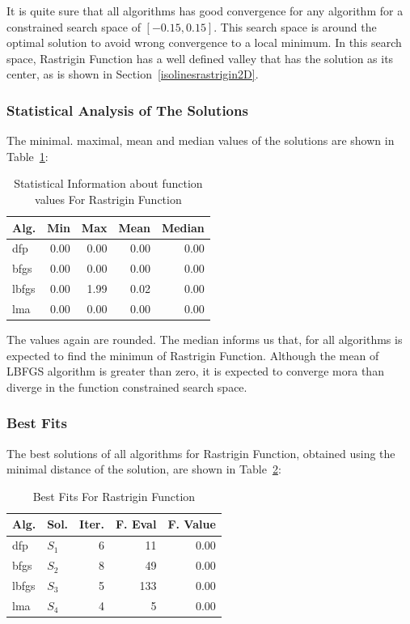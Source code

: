 \documentclass[conference]{IEEEtran}
\begin{document}
It is quite sure that all algorithms has good convergence for any algorithm for a
constrained search space of $\left[-0.15, 0.15\right]$. This search space is around
the optimal solution to avoid wrong convergence to a local minimum. In this search space,
Rastrigin Function has a well defined valley that has the solution as its center, as is shown in
Section~\ref{isolinesrastrigin2D}.

\subsubsection{Statistical Analysis of The Solutions}
\label{statisticalanalysisrastrigin2d2D}


The minimal. maximal, mean and median values of the solutions are shown in Table~\ref{function_values:rastrigin2d}:

\begin{table}[H]
\centering
\caption{Statistical Information about function values For Rastrigin Function}
\label{function_values:rastrigin2d}
\begin{tabular}{lrrrr}
\toprule
 Alg. &  Min &  Max &  Mean &  Median \\
\midrule
  dfp & 0.00 & 0.00 &  0.00 &    0.00 \\
 bfgs & 0.00 & 0.00 &  0.00 &    0.00 \\
lbfgs & 0.00 & 1.99 &  0.02 &    0.00 \\
  lma & 0.00 & 0.00 &  0.00 &    0.00 \\
\bottomrule
\end{tabular}
\end{table}

The values again are rounded. The median informs us that, for all
algorithms is expected to find the minimun of Rastrigin Function.
Although the mean of LBFGS algorithm is greater than zero, it is expected
to converge mora than diverge in the function constrained search space.
\subsubsection{Best Fits}
\label{bestfitsrastrigin2d2D}


The best solutions of all algorithms for Rastrigin Function, obtained using the minimal
distance of the solution, are shown in Table~\ref{solutions:rastrigin2d}:

\begin{table}[H]
\centering
\caption{Best Fits For Rastrigin Function}
\label{solutions:rastrigin2d}
\begin{tabular}{llrrr}
\toprule
 Alg. &    Sol. &  Iter. &  F. Eval &  F. Value \\
\midrule
  dfp & $S_{1}$ &      6 &       11 &      0.00 \\
 bfgs & $S_{2}$ &      8 &       49 &      0.00 \\
lbfgs & $S_{3}$ &      5 &      133 &      0.00 \\
  lma & $S_{4}$ &      4 &        5 &      0.00 \\
\bottomrule
\end{tabular}
\end{table}
\end{document}
